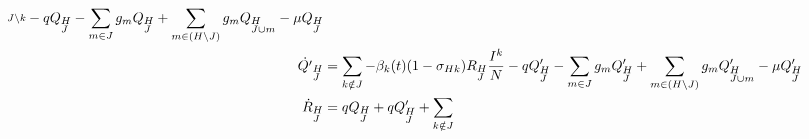 \begin{footnotesize}
\begin{align}
{\begin{subarray}{l}
        J \setminus k \end{subarray}} -q Q_{\begin{subarray}{l}H \\ J
      \end{subarray}} -\sum_{m \in J } g_m Q_{\begin{subarray}{l}H \\
        J \end{subarray}} + \sum_{m \in (H \setminus J)} g_m
    Q_{\begin{subarray}{l}H \\ J \cup m \end{subarray}} -\mu
    Q_{\begin{subarray}{l}H \\ J \end{subarray}} \notag \\
    \dot{Q'}_{\begin{subarray}{l}H\\ J \end{subarray}} &= \sum_{k
      \notin J} -\beta_k(t) (1 -\sigma_{Hk}) R_{\begin{subarray}{l}H\\
        J \end{subarray}} \frac{I^k}{N} -q Q'_{\begin{subarray}{l}H \\
        J \end{subarray}} -\sum_{m \in J} g_m Q'_{\begin{subarray}{l}H
        \\ J \end{subarray}} + \sum_{m \in (H \setminus J)} g_m
    Q'_{\begin{subarray}{l}H \\ J \cup m \end{subarray}} -\mu
    Q'_{\begin{subarray}{l}H \\ J \end{subarray}} \notag \\
    \dot{R}_{\begin{subarray}{l}H\\ J \end{subarray}} &= q
    Q_{\begin{subarray}{l}H \\ J \end{subarray}} +q
    Q'_{\begin{subarray}{l}H \\ J \end{subarray}} +\sum_{k \notin J}

\end{align}
\end{footnotesize}
